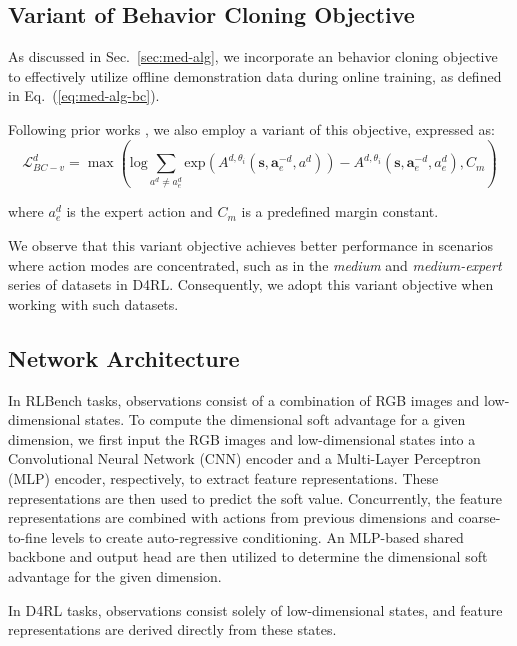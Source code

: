 

\subsection{Variant of Behavior Cloning Objective}
As discussed in Sec.~\ref{sec:med-alg}, we incorporate an behavior cloning objective to effectively utilize offline demonstration data during online training, as defined in Eq.~(\ref{eq:med-alg-bc}). 

Following prior works \cite{CQL}, we also employ a variant of this objective, expressed as:  
\begin{equation}
    \mathcal{L}_{BC-v}^{d} = \max \left( 
    \text{log} \sum_{a^d \neq a^d_e}
    \text{exp} \left( A^{d, \theta_i}(\mathbf{s}, \mathbf{a}^{-d}_e, a^{d}) \right) - A^{d, \theta_i}(\mathbf{s}, \mathbf{a}^{-d}_e, a^{d}_e), C_m \right)
\end{equation}

where $a^d_e$ is the expert action and $C_m$ is a predefined margin constant.

We observe that this variant objective achieves better performance in scenarios where action modes are concentrated, such as in the \textit{medium} and \textit{medium-expert} series of datasets in D4RL.
Consequently, we adopt this variant objective when working with such datasets.

\subsection{Network Architecture}

In RLBench tasks, observations consist of a combination of RGB images and low-dimensional states. 
To compute the dimensional soft advantage for a given dimension, we first input the RGB images and low-dimensional states into a Convolutional Neural Network (CNN) \cite{CNN} encoder and a Multi-Layer Perceptron (MLP) \cite{MLP} encoder, respectively, to extract feature representations. 
These representations are then used to predict the soft value. 
Concurrently, the feature representations are combined with actions from previous dimensions and coarse-to-fine levels to create auto-regressive conditioning. 
An MLP-based shared backbone and output head are then utilized to determine the dimensional soft advantage for the given dimension.

In D4RL tasks, observations consist solely of low-dimensional states, and feature representations are derived directly from these states.


